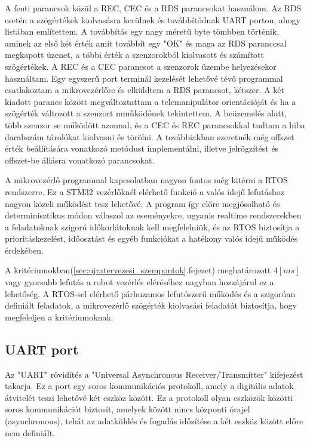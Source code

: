 A fenti parancsok közül a REC, CEC és a RDS parancsokat használom. Az RDS esetén a szögértékek kiolvasásra kerülnek és továbbítódnak UART porton, ahogy listában említettem. A továbbítás egy nagy méretű byte tömbben történik, aminek az első két érték amit továbbít egy "OK" és maga az RDS paranccsal megkapott üzenet, a többi érték a szenzorokból kiolvasott és számított szögértékek. A REC és a CEC parancsot a szenzorok üzembe helyezésekor használtam. Egy egyszerű port terminál kezelését lehetővé tévő programmal csatlakoztam a mikrovezérlőre és elküldtem a RDS parancsot, kétszer. A két kiadott parancs között megváltoztattam a telemanipulátor orientációját és ha a szögérték változott a szenzort mműködőnek tekintettem. A beüzemelés alatt, több szenzor se működött azonnal, és a CEC és REC parancsokkal tudtam a hiba darabszám tárolókat kiolvasni és törölni. A továbbiakban szeretnék még offszet érték beállítására vonatkozó metódust implementálni, illetve jelrögzítést és offszet-be állásra vonatkozó parancsokat.

A mikrovezérlő programmal kapcsolatban nagyon fontos még kitérni a RTOS rendszerre. Ez a STM32 vezérlőknél elérhető funkció a valós idejű lefutáshoz nagyon közeli működést tesz lehetővé. A program így előre megjósolható és determinisztikus módon válaszol az eseményekre, ugyanis realtime rendszerekben a feladatoknak szigorú időkorlátoknak kell megfelelniük, és az RTOS biztosítja a prioritáskezelést, időosztást és egyéb funkciókat a hatékony valós idejű működés érdekében.


A kritériumokban(\ref{sec:ujratervezesi_szempontok}.fejezet) meghatározott $4[ms]$ vagy gyorsabb lefutás a robot vezérlés eléréséhez nagyban hozzájárul ez a lehetőség. A RTOS-sel elérhető párhuzamos lefutószerű működés és a szigorúan definiált feladatok, a mikrovezérlő szögérték kiolvasási feladatát biztosítja, hogy megfeleljen a kritériumoknak.

\subsection{UART port}
\label{sec:uart_port}

Az "UART" rövidítés a "Universal Asynchronous Receiver/Transmitter" kifejezést takarja. Ez a port egy soros kommunikációs protokoll, amely a digitális adatok átvitelét teszi lehetővé két eszköz között. Ez a protokoll olyan eszközök közötti soros kommunikációt biztosít, amelyek között nincs központi órajel (asynchronous), tehát az adatküldés és fogadás időzítése a két eszköz között előre nem definiált.

